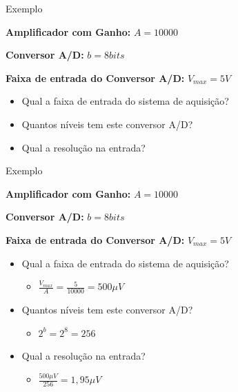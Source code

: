 \documentclass[aspectratio=169,
				xcolor=table]{beamer}
\begin{document}
	\begin{frame}{Exemplo}
	
		\begin{block}{}
			\textbf{Amplificador com Ganho:} $A=10000$
			
			\textbf{Conversor A/D:} $b=8 bits$
			
			\textbf{Faixa de entrada do Conversor A/D:} $V_{max}=5V$
		
		\end{block}
		\begin{itemize}
				\item Qual a faixa de entrada do sistema de aquisição? %
				\item Quantos níveis tem este conversor A/D? %
				\item Qual a resolução na entrada? %
		\end{itemize}
		
	\end{frame}
	

	\begin{frame}{Exemplo}
	
		\begin{block}{}
			\textbf{Amplificador com Ganho:} $A=10000$
			
			\textbf{Conversor A/D:} $b=8 bits$
			
			\textbf{Faixa de entrada do Conversor A/D:} $V_{max}=5V$
		
		\end{block}
		
			
			\begin{itemize}
				\item Qual a faixa de entrada do sistema de aquisição? 
				\pause
				\begin{itemize}
					\item $\frac{V_{max}}{A}=\frac{5}{10000}=500\mu V$
				\end{itemize}
				\pause
				\item Quantos níveis tem este conversor A/D? 
				\pause
				\begin{itemize}
					\item $2^b=2^8=256$
				\end{itemize}
				\pause
				\item Qual a resolução na entrada? 
				\pause
				\begin{itemize}
					\item $\frac{500 \mu V}{256}=1,95 \mu V$
				\end{itemize}
			\end{itemize}
	\end{frame}
		
	\begin{frame}{}
	\end{frame}	
\end{document}
